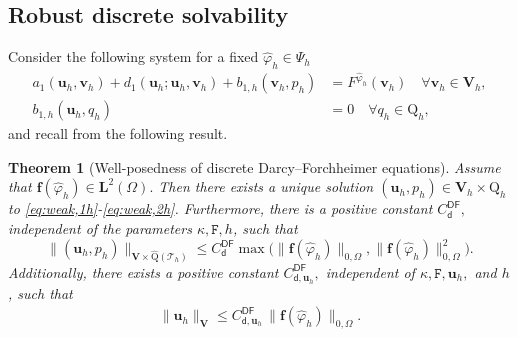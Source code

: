 \documentclass[11pt, reqno, a4paper, twoside]{article}
\newcommand{\bu}{\boldsymbol{u}}
\newcommand{\bv}{\boldsymbol{v}}
\renewcommand{\bf}{\boldsymbol{f}}
\newcommand{\rF}{\mathtt{F}}
\newcommand{\rQ}{\mathrm{Q}}
\newcommand{\bL}{\mathbf{L}}
\newcommand{\bV}{\mathbf{V}}
\newcommand{\cT}{\mathcal{T}}
\newtheorem{theorem}{Theorem}[section]
\numberwithin{equation}{section}
\numberwithin{remark}{section}
\numberwithin{figure}{section}
\numberwithin{table}{section}
\begin{document}
{{\subsection{Robust discrete solvability}
 Consider the following system for a fixed $\hat{\varphi}_h\in \Psi_h$ 
\begin{subequations}\label{eq:weak.fixed.u.hat.disc}
    \begin{align}
    a_1(\bu_h,\bv_h) + d_1(\bu_h; \bu_h,\bv_h) +  b_{1,h}(\bv_h,p_h) & = F^{\hat\varphi_h}(\bv_h) \quad \forall \bv_h \in \bV_h,\label{eq:weak,1.hat.u.disc}\\
    b_{1,h}(\bu_h,q_h) & = 0 \quad \forall q_h \in \rQ_h,\label{eq:weak,2.hat.u.disc}
    \end{align}
\end{subequations}
and recall from \cite[Theorem~4.3]{dhpr_sinum26} the following result.
\begin{theorem}[Well-posedness of discrete  Darcy--Forchheimer equations]\label{th:discrete-DF}
 Assume that 
 $\bf(\hat{\varphi}_h)\in \bL^2(\Omega).$ Then there exists a unique  solution $(\bu_h,p_h)\in \bV_h\times\rQ_h$ to   \eqref{eq:weak,1h}-\eqref{eq:weak,2h}. Furthermore, there is a positive constant ${C^{\mathsf{DF}}_{\mathsf{d}}},$ independent of the parameters $\kappa, \rF,h$,  such that 
\begin{equation*}
 \|(\bu_h, p_h )\|_{\bV\times\widehat{\rQ}(\cT_h)}  \leq {C^{\mathsf{DF}}_{\mathsf{d}}}\max \bigl(\|\bf(\hat{\varphi}_h)\|_{0,\Omega},\|\bf(\hat{\varphi}_h)\|_{0,\Omega} ^2\bigr).
    \end{equation*}
Additionally, there exists a positive constant \(C^{\mathsf{DF}}_{\mathsf{d},\bu_h},\) independent of \(\kappa,\rF, \bu_h,\) and \(h\), such that 
    \begin{align}\label{est:disc.uh.bound}
        \|\bu_h\|_{\bV}\leq C^{\mathsf{DF}}_{\mathsf{d},\bu_h}\,\|\bf(\hat{\varphi}_h)\|_{0,\Omega}.
    \end{align}
\end{theorem}

}}
\end{document}
